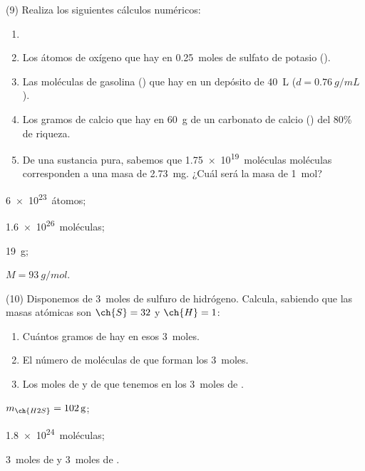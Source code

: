 \documentclass[10pt]{article}
\begin{document}
\begin{multicols}{2}
\begin{exercise}
  (9) Realiza los siguientes cálculos numéricos:
  \begin{enumerate}
    \item
    \item Los átomos de oxígeno que hay en \SI{0.25}{moles} de sulfato
    de potasio ().
    \item Las moléculas de gasolina () que hay en un depósito
    de \SI{40}{\liter} (\( d = \SI{0.76}{g/mL} \)).
    \item Los gramos de calcio que hay en \SI{60}{g} de un carbonato de
    calcio () del 80\% de riqueza.
    \item De una sustancia pura, sabemos que \SI{1.75e19}{moléculas} moléculas
    corresponden a una masa de \SI{2.73}{mg}. ¿Cuál será la masa de \SI{1}{mol}?
  \end{enumerate}
\end{exercise}
\begin{solution}
  \begin{enumerate*}
    \item \SI{6e23}{átomos}; \item \SI{1.6e26}{moléculas}; \item \SI{19}{g}; \item \( M = \SI{93}{g/mol} \).
  \end{enumerate*}
\end{solution}

\begin{exercise}
  (10) Disponemos de \SI{3}{moles} de sulfuro de hidrógeno. Calcula,
  sabiendo que las masas atómicas son \( \ch{S} = 32 \) y \( \ch{H} = 1 \):
  \begin{enumerate}
    \item Cuántos gramos de  hay en esos \SI{3}{moles}.
    \item El número de moléculas de  que forman los \SI{3}{moles}.
    \item Los moles de  y de  que tenemos en los \SI{3}{moles} de .
  \end{enumerate}
\end{exercise}
\begin{solution}
  \begin{enumerate*}
    \item \( m_{\ch{H2S}} = \SI{102}{\gram} \);
    \item \SI{1.8e24}{moléculas};
    \item \SI{3}{moles} de  y \SI{3}{moles} de .
  \end{enumerate*}
\end{solution}


\end{multicols}
\end{document}
